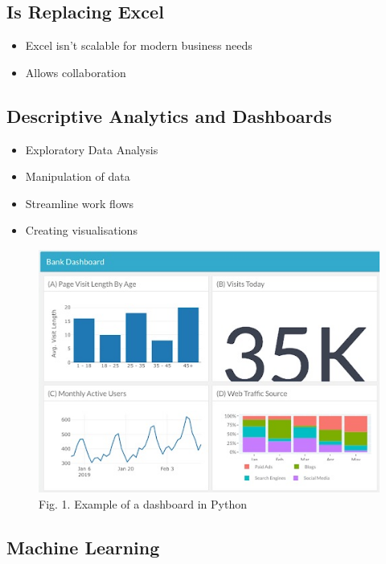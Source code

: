 \documentclass[11pt]{article}
\makeatletter
\def\maxwidth{\ifdim\Gin@nat@width>\linewidth\linewidth
    \else\Gin@nat@width\fi}
\let\Oldincludegraphics\includegraphics
\renewcommand{\includegraphics}[1]{\Oldincludegraphics[width=.8\maxwidth]{#1}}
\providecommand{\tightlist}{%
      \setlength{\itemsep}{0pt}\setlength{\parskip}{0pt}}
\makeatother
\begin{document}
    \hypertarget{is-replacing-excel}{%
\subsection{Is Replacing Excel}\label{is-replacing-excel}}

\begin{itemize}
\tightlist
\item
  Excel isn't scalable for modern business needs
\item
  Allows collaboration
\end{itemize}

    \hypertarget{descriptive-analytics-and-dashboards}{%
\subsection{Descriptive Analytics and
Dashboards}\label{descriptive-analytics-and-dashboards}}

\begin{itemize}
\tightlist
\item
  Exploratory Data Analysis
\item
  Manipulation of data
\item
  Streamline work flows
\item
  Creating visualisations
\end{itemize}

    \begin{figure}[H]
\centering
\includegraphics{figs/dashboard.jpg}
\caption{Fig. 1. Example of a dashboard in Python}
\end{figure}

    \hypertarget{machine-learning}{%
\subsection{Machine Learning}\label{machine-learning}}
\end{document}
